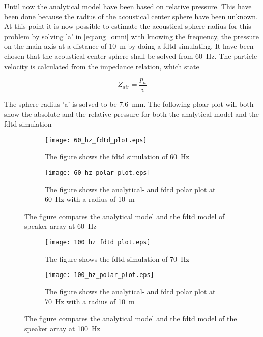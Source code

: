 Until now the analytical model have been based on relative pressure. This have been done because the radius of the acoustical center sphere have been unknown. At this point it is now possible to estimate the acoustical sphere radius for this problem by solving 'a' in \autoref{eq:aug_omni} with knowing the frequency, the pressure on the main axis at a distance of \SI{10}{\meter} by doing a \gls{fdtd} simulating. It have been chosen that the acoustical center sphere shall be solved from \SI{60}{\hertz}. The particle velocity is calculated from the impedance relation, which state

\begin{equation}
Z_{air}=\frac{p_a}{v}
\end{equation}  

    \startexplain
    \stopexplain

The sphere radius 'a' is solved to be \SI{7.6}{\milli\meter}. The following ploar plot will both show the absolute and the relative pressure for both the analytical model and the \gls{fdtd} simulation




\begin{figure}[H]
\centering
\begin{subfigure}[htbp]{0.55\textwidth}
		\texttt{[image: 60\_hz\_fdtd\_plot.eps]}
		\caption{The figure shows the \gls{fdtd} simulation of \SI{60}{\hertz}}
		\label{fig:fdtd_60_Hz}
\end{subfigure}
\begin{subfigure}[htbp]{0.35\textwidth}
		\texttt{[image: 60\_hz\_polar\_plot.eps]}
		\caption{The figure shows the analytical- and \gls{fdtd} polar plot at \SI{60}{\hertz} with a radius of \SI{10}{\meter}}
		\label{fig:polar_60_Hz}
\end{subfigure} 
\caption{The figure compares the analytical model and the \gls{fdtd} model of speaker array at \SI{60}{\hertz}}
\end{figure}


\begin{figure}[H]
\centering
\begin{subfigure}[htbp]{0.55\textwidth}
		\texttt{[image: 100\_hz\_fdtd\_plot.eps]}
		\caption{The figure shows the \gls{fdtd} simulation of \SI{70}{\hertz}}
		\label{fig:fdtd_100_Hz}
\end{subfigure}
\begin{subfigure}[htbp]{0.35\textwidth}
		\texttt{[image: 100\_hz\_polar\_plot.eps]}
		\caption{The figure shows the analytical- and \gls{fdtd} polar plot at \SI{70}{\hertz} with a radius of \SI{10}{\meter}}
		\label{fig:polar_100_Hz}
\end{subfigure} 
\caption{The figure compares the analytical model and the \gls{fdtd} model of the speaker array at \SI{100}{\hertz}}
\end{figure}


